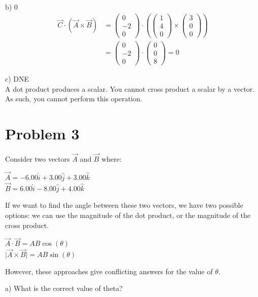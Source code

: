 \documentclass[12pt]{article}
\begin{document}
b) 0
\begin{align*}
    \vec{C} \cdot ( \vec{A} \times \vec{B} ) &= \begin{pmatrix} 0\\ -2\\ 0 \end{pmatrix} \cdot ( \begin{pmatrix} 1\\ 4\\ 0 \end{pmatrix} \times \begin{pmatrix} 3\\ 0\\ 0 \end{pmatrix} )\\
            &= \begin{pmatrix} 0\\ -2\\ 0 \end{pmatrix} \cdot \begin{pmatrix} 0\\ 0\\ 8 \end{pmatrix} 
            = \boxed{ 0 }
\end{align*}

c) DNE \\
A dot product produces a scalar. You cannot cross product a scalar by a vector. As such, you cannot perform this operation.

\pagebreak
\section*{Problem 3}
Consider two vectors $\vec{A}$ and $\vec{B}$ where:
\begin{center}
    $\vec{A} = -6.00 \hat{i} + 3.00 \hat{j} + 3.00 \hat{k}$\\
    $\vec{B} = 6.00 \hat{i} - 8.00 \hat{j} + 4.00 \hat{k}$
\end{center}
If we want to find the angle between these two vectors, we have two possible options: we can
use the magnitude of the dot product, or the magnitude of the cross product.
\begin{center}
    $\vec{A} \cdot \vec{B} = AB \cos(\theta)$\\
    $\lvert\vec{A} \times \vec{B} \rvert = AB \sin(\theta)$
\end{center}
However, these approaches give conflicting answers for the value of $\theta$.

a) What is the correct value of theta?
\end{document}
